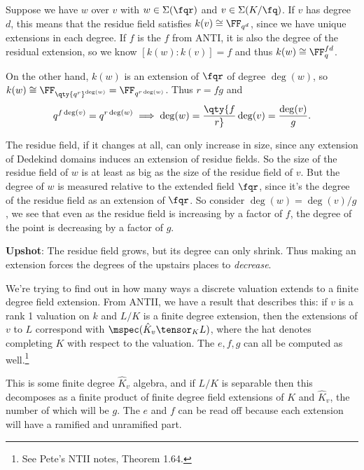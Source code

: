 \begin{remark}

Suppose we have \(w\) over \(v\) with \(w\in \Sigma(\fqr)\) and
\(v\in \Sigma(K/\fq)\). If \(v\) has degree \(d\), this means that the
residue field satisfies \(k(v) \cong \FF_{q^{d}}\), since we have unique
extensions in each degree. If \(f\) is the \(f\) from ANTI, it is also
the degree of the residual extension, so we know \([k(w): k(v)] = f\)
and thus \(k(w) \cong \FF_q^{f d}\).

On the other hand, \(k(w)\) is an extension of \(\fqr\) of degree
\(\deg(w)\), so
\(k(w) \cong \FF_{ \qty{q^r}^{\deg(w)} } = \FF_{q^{r\deg(w)}}\). Thus
\(r=fg\) and
\begin{align*}  
q^{f\deg(v)} = q^{r\deg(w)} \implies \deg(w) = \qty{f\over r}\deg(v) = { \deg(v) \over g}
.\end{align*}

The residue field, if it changes at all, can only increase in size,
since any extension of Dedekind domains induces an extension of residue
fields. So the size of the residue field of \(w\) is at least as big as
the size of the residue field of \(v\). But the degree of \(w\) is
measured relative to the extended field \(\fqr\), since it's the degree
of the residue field as an extension of \(\fqr\). So consider
\(\deg(w) = \deg(v)/g\), we see that even as the residue field is
increasing by a factor of \(f\), the degree of the point is decreasing
by a factor of \(g\).

\textbf{Upshot}: The residue field grows, but its degree can only
shrink. Thus making an extension forces the degrees of the upstairs
places to \emph{decrease}.

\end{remark}

We're trying to find out in how many ways a discrete valuation extends
to a finite degree field extension. From ANTII, we have a result that
describes this: if \(v\) is a rank 1 valuation on \(k\) and \(L/K\) is a
finite degree extension, then the extensions of \(v\) to \(L\)
correspond with \(\mspec(\hat{K}_v \tensor_K L)\), where the hat denotes
completing \(K\) with respect to the valuation. The \(e,f,g\) can all be
computed as well.\footnote{See Pete's NTII notes, Theorem 1.64.}

This is some finite degree \(\hat{K}_v\) algebra, and if \(L/K\) is
separable then this decomposes as a finite product of finite degree
field extensions of \(K\) and \(\hat{K}_v\), the number of which will be
\(g\). The \(e\) and \(f\) can be read off because each extension will
have a ramified and unramified part.

